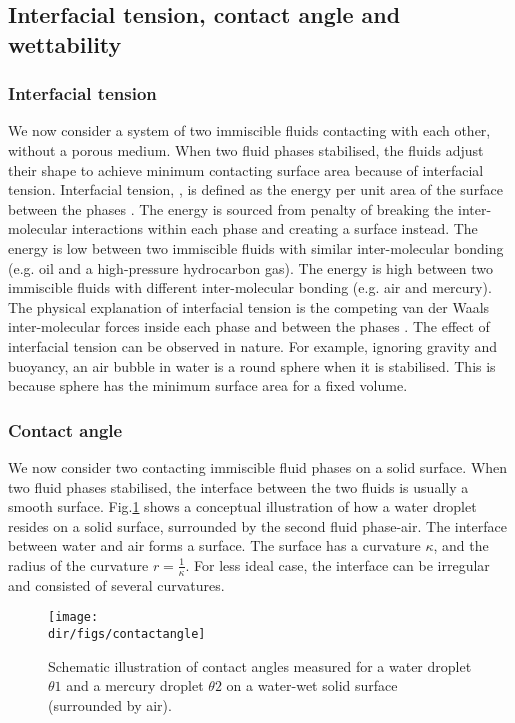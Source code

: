 \subsection{Interfacial tension, contact angle and wettability}
\subsubsection{Interfacial tension}
We now consider a system of two immiscible fluids contacting with each other, without a porous medium. When two fluid phases stabilised, the fluids adjust their shape to achieve minimum contacting surface area because of interfacial tension. Interfacial tension, \textsigma, is defined as the energy per unit area of the surface between the phases \citep{blunt2017multiphase}. The energy is sourced from penalty of breaking the inter-molecular interactions within each phase and creating a surface instead. The energy is low between two immiscible fluids with similar inter-molecular bonding (e.g. oil and a high-pressure hydrocarbon gas). The energy is high between two immiscible fluids with different inter-molecular bonding (e.g. air and mercury). The physical explanation of interfacial tension is the competing van der Waals inter-molecular forces inside each phase and between the phases \citep{blunt2017multiphase}. The effect of interfacial tension can be observed in nature. For example, ignoring gravity and buoyancy, an air bubble in water is a round sphere when it is stabilised. This is because sphere has the minimum surface area for a fixed volume. 

\subsubsection{Contact angle}
We now consider two contacting immiscible fluid phases on a solid surface. When two fluid phases stabilised, the interface between the two fluids is usually a smooth surface. Fig.\ref{contactangle} shows a conceptual illustration of how a water droplet resides on a solid surface, surrounded by the second fluid phase-air. The interface between water and air forms a surface. The surface has a curvature $\kappa$, and the radius of the curvature $r=\frac{1}{\kappa}$. For less ideal case, the interface can be irregular and consisted of several curvatures.

\begin{figure}[htbp]
  \centering
  \texttt{[image: \\dir/figs/contactangle]}
  \caption{Schematic illustration of contact angles measured for a water droplet $\theta 1$ and a mercury droplet $\theta 2$ on a water-wet solid surface (surrounded by air).}
  \label{contactangle}
\end{figure}

